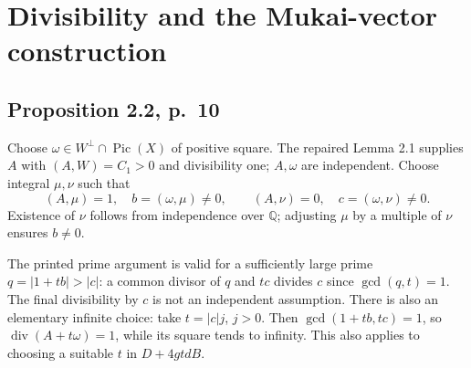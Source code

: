 \documentclass[10pt]{article}
\begin{document}
\section*{Divisibility and the Mukai-vector construction}
\subsection*{Proposition 2.2, p. 10}
Choose \(\omega\in W^\perp\cap\operatorname{Pic}(X)\) of positive square. The repaired Lemma 2.1 supplies \(A\) with \((A,W)=C_1>0\) and divisibility one; \(A,\omega\) are independent. Choose integral \(\mu,\nu\) such that \[(A,\mu)=1,\quad b=(\omega,\mu)\ne0,\qquad
 (A,\nu)=0,\quad c=(\omega,\nu)\ne0.\] Existence of \(\nu\) follows from independence over \(\mathbb Q\); adjusting \(\mu\) by a multiple of \(\nu\) ensures \(b\ne0\).\par
The printed prime argument is valid for a sufficiently large prime \(q=|1+tb|>|c|\): a common divisor of \(q\) and \(tc\) divides \(c\) since \(\gcd(q,t)=1\). The final divisibility by \(c\) is not an independent assumption. There is also an elementary infinite choice: take \(t=|c|j\), \(j>0\). Then \(\gcd(1+tb,tc)=1\), so \(\operatorname{div}(A+t\omega)=1\), while its square tends to infinity. This also applies to choosing a suitable \(t\) in \(D+4gtdB\).\par
\end{document}
